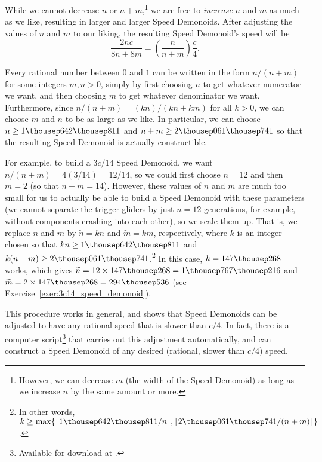 While we cannot decrease $n$ or $n+m$,\footnote{However, we can decrease $m$ (the width of the Speed Demonoid) as long as we increase $n$ by the same amount or more.} we are free to \emph{increase} $n$ and $m$ as much as we like, resulting in larger and larger Speed Demonoids. After adjusting the values of $n$ and $m$ to our liking, the resulting Speed Demonoid's speed will be
\[
	\frac{2nc}{8n + 8m} = \left(\frac{n}{n+m}\right)\frac{c}{4}.
\]

Every rational number between $0$ and $1$ can be written in the form $n/(n+m)$ for some integers $m,n > 0$, simply by first choosing $n$ to get whatever numerator we want, and then choosing $m$ to get whatever denominator we want. Furthermore, since $n/(n+m) = (kn)/(kn+km)$ for all $k > 0$, we can choose $m$ and $n$ to be as large as we like. In particular, we can choose $n \geq 1{\thousep}642{\thousep}811$ and $n+m \geq 2{\thousep}061{\thousep}741$ so that the resulting Speed Demonoid is actually constructible.

For example, to build a $3c/14$ Speed Demonoid, we want $n/(n+m) = 4(3/14) = 12/14$, so we could first choose $n = 12$ and then $m = 2$ (so that $n+m = 14$). However, these values of $n$ and $m$ are much too small for us to actually be able to build a Speed Demonoid with these parameters (we cannot separate the trigger gliders by just $n = 12$ generations, for example, without components crashing into each other), so we scale them up. That is, we replace $n$ and $m$ by $\widetilde{n} = kn$ and $\widetilde{m} = km$, respectively, where $k$ is an integer chosen so that $kn \geq 1{\thousep}642{\thousep}811$ and $k(n+m) \geq 2{\thousep}061{\thousep}741$.\footnote{In other words, $k \geq \max\{ \lceil 1{\thousep}642{\thousep}811/n \rceil, \lceil 2{\thousep}061{\thousep}741/(n+m) \rceil \}$.} In this case, $k = 147{\thousep}268$ works, which gives $\widetilde{n} = 12 \times 147{\thousep}268 = 1{\thousep}767{\thousep}216$ and $\widetilde{m} = 2 \times 147{\thousep}268 = 294{\thousep}536$ (see Exercise~\ref{exer:3c14_speed_demonoid}).

This procedure works in general, and shows that Speed Demonoids can be adjusted to have any rational speed that is slower than $c/4$. In fact, there is a computer script\footnote{Available for download at .} that carries out this adjustment automatically, and can construct a Speed Demonoid of any desired (rational, slower than $c/4$) speed.



